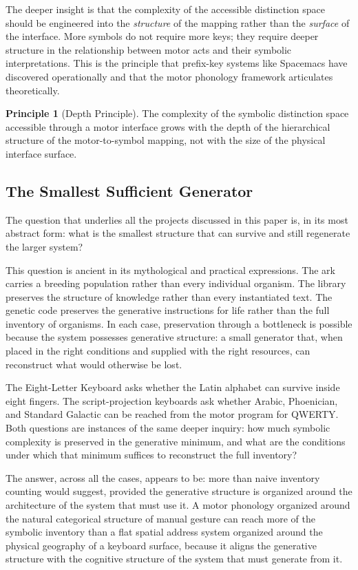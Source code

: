 \documentclass[12pt,a4paper]{article}
\theoremstyle{plain}
\theoremstyle{definition}
\newtheorem{principle}{Principle}
\theoremstyle{remark}
\begin{document}
The deeper insight is that the complexity of the accessible distinction space
should be engineered into the \emph{structure} of the mapping rather than
the \emph{surface} of the interface. More symbols do not require more keys;
they require deeper structure in the relationship between motor acts and
their symbolic interpretations. This is the principle that prefix-key systems
like Spacemacs have discovered operationally and that the motor phonology
framework articulates theoretically.

\begin{principle}[Depth Principle]
The complexity of the symbolic distinction space accessible through a motor
interface grows with the depth of the hierarchical structure of the
motor-to-symbol mapping, not with the size of the physical interface surface.
\end{principle}

\subsection{The Smallest Sufficient Generator}

The question that underlies all the projects discussed in this paper is, in its
most abstract form: what is the smallest structure that can survive and still
regenerate the larger system?

This question is ancient in its mythological and practical expressions. The
ark carries a breeding population rather than every individual organism. The
library preserves the structure of knowledge rather than every instantiated
text. The genetic code preserves the generative instructions for life rather
than the full inventory of organisms. In each case, preservation through a
bottleneck is possible because the system possesses generative structure: a
small generator that, when placed in the right conditions and supplied with
the right resources, can reconstruct what would otherwise be lost.

The Eight-Letter Keyboard asks whether the Latin alphabet can survive inside
eight fingers. The script-projection keyboards ask whether Arabic, Phoenician,
and Standard Galactic can be reached from the motor program for QWERTY. Both
questions are instances of the same deeper inquiry: how much symbolic
complexity is preserved in the generative minimum, and what are the conditions
under which that minimum suffices to reconstruct the full inventory?

The answer, across all the cases, appears to be: more than naive inventory
counting would suggest, provided the generative structure is organized around
the architecture of the system that must use it. A motor phonology organized
around the natural categorical structure of manual gesture can reach more of
the symbolic inventory than a flat spatial address system organized around
the physical geography of a keyboard surface, because it aligns the generative
structure with the cognitive structure of the system that must generate from it.
\end{document}
